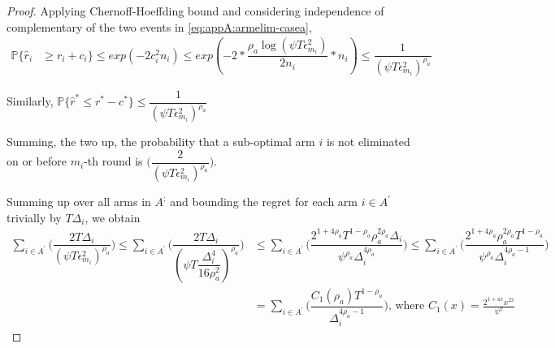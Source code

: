 \begin{proof}
 
% 
Applying Chernoff-Hoeffding bound and considering independence of complementary of the two events in \ref{eq:appA:armelim-casea},
  \begin{align*}
\mathbb{P}\lbrace\hat{r}_{i}&\geq r_{i} + c_{i}\rbrace\leq exp(-2c_{i}^{2}n_{i})
\leq exp(-2 * \dfrac{\rho_{a}\log (\psi T\epsilon_{m_{i}}^{2})}{2 n_{i}} *n_{i})
\leq \dfrac{1}{(\psi T\epsilon_{m_{i}}^{2})^{\rho_{a}}}   
  \end{align*}
 
 
Similarly, $\mathbb{P}\lbrace\hat{r}^{*}\leq r^{*} - c^{*}\rbrace\leq \dfrac{1}{(\psi  T\epsilon_{m_{i}}^{2})^{\rho_{a}}}$
 
Summing, the two up, the probability that a sub-optimal arm ${i}$ is not eliminated on or before $m_{i}$-th round is  $\bigg(\dfrac{2}{(\psi T\epsilon_{m_{i}}^{2})^{\rho_{a}}}\bigg)$. 
 
Summing up over all arms in $A^{;}$ and bounding the regret for each arm $i\in A^{'}$ trivially by $T\Delta_{i}$, we obtain
   \begin{align*}
\sum_{i\in A^{'}}\bigg(\dfrac{2T\Delta_{i}}{(\psi T\epsilon_{m_{i}}^{2})^{\rho_{a}}}\bigg)
\leq\sum_{i\in A^{'}}\bigg(\dfrac{2T\Delta_{i}}{(\psi T\dfrac{\Delta_{i}^{4}}{16\rho_{a}^{2}})^{\rho_{a}}}\bigg)
&\leq \sum_{i\in A^{'}}\bigg(\dfrac{2^{1+4\rho_{a}}T^{1-\rho_{a}}\rho_{a}^{2\rho_{a}}\Delta_{i}}{\psi^{\rho_{a}}\Delta_{i}^{4\rho_{a}}}\bigg)
\leq \sum_{i\in A^{'}}\bigg(\dfrac{2^{1+4\rho_{a}}\rho_{a}^{2\rho_{a}}T^{1-\rho_{a}}}{\psi^{\rho_{a}}\Delta_{i}^{4\rho_{a}-1}}\bigg)\\   
& =\sum_{i\in A^{'}}\bigg(\dfrac{C_{1}(\rho_{a})T^{1-\rho_{a}}}{\Delta_{i}^{4\rho_{a}-1}}\bigg) \text{, where } C_1(x) = \frac{2^{1+4x}x^{2x}}{\psi^{x}}
   \end{align*}


\end{proof}
